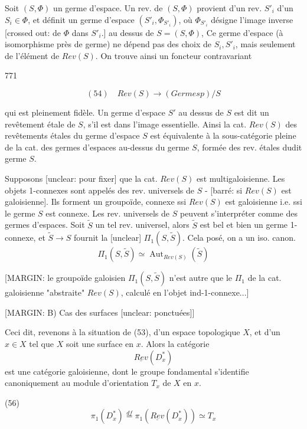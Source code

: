 Soit $(S, \Phi)$ un germe d'espace. Un
rev. de $(S, \Phi)$ provient d'un rev.
$S'_i$ d'un $S_i \in \Phi$, et définit un
germe d'espace $(S'_i, \Phi_{S'_i})$, où $\Phi_{S'_i}$ désigne
l'image inverse [crossed out: de $\Phi$ dans $S'_i$.] au dessus de $S = (S, \Phi)$, Ce
germe d'espace (à isomorphisme près
de germe) ne dépend pas des choix
de $S_i, S'_i$, mais seulement de
l'élément de $Rev(S)$. On trouve
ainsi un foncteur contravariant

\newpage


771

$$ (54) \quad Rev(S) \to (Germesp)/S $$

qui est pleinement fidèle. Un germe d'espace $S'$ au dessus de $S$ est dit un revêtement étale de $S$, s'il est dans l'image essentielle. Ainsi la cat. $Rev(S)$ des revêtements étales du germe d'espace $S$ est équivalente à la sous-catégorie pleine de la cat. des germes d'espaces au-dessus du germe $S$, formée des rev. étales dudit germe $S$.

Supposons [unclear: pour fixer] que la cat. $Rev(S)$ est multigaloisienne. Les objets 1-connexes sont appelés des rev. universels de $S$ - [barré: si $Rev(S)$ est galoisienne]. Ils forment un groupoïde, connexe ssi $Rev(S)$ est galoisienne i.e. ssi le germe $S$ est connexe. Les rev. universels de $S$ peuvent s'interpréter comme des germes d'espaces. Soit $\tilde{S}$ un tel rev. universel, alors $\tilde{S}$ est bel et bien un germe 1-connexe, et $\tilde{S} \to S$ fournit la [unclear] $\Pi_1(S, \tilde{S})$. Cela posé, on a un iso. canon.
$$ \Pi_1(S, \tilde{S}) \simeq \operatorname{Aut}_{Rev(S)}(\tilde{S}) $$

[MARGIN: le groupoïde galoisien $\Pi_1(S, \tilde{S})$ n'est autre que le $\Pi_1$ de la cat. galoisienne "abstraite" $Rev(S)$, calculé en l'objet ind-1-connexe...]

\newpage


[MARGIN: B) Cas des surfaces [unclear: ponctuées]]

Ceci dit, revenons à la situation de (53),
d'un espace topologique $X$, et d'un
$x \in X$ tel que $X$ soit une surface en $x$.
Alors la catégorie
$$ \underline{Rev} (D^*_x) $$
est une catégorie galoisienne, dont le
groupe fondamental s'identifie canoniquement
au module d'orientation $T_x$ de $X$ en $x$.

(56) $$ \pi_1(D^*_x) \overset{df}{=} \pi_1(\underline{Rev}(D^*_x)) \simeq T_x $$

